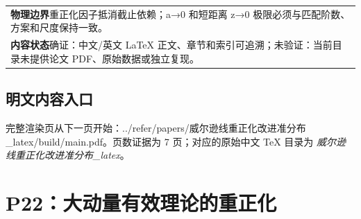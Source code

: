 \documentclass[UTF8,11pt,oneside]{ctexbook}
\begin{document}
\begin{table}[htbp]
\begin{tabular}{@{}p{}@{}}
    \textbf{物理边界}\quad 重正化因子抵消截止依赖；a→0 和短距离 z→0 极限必须与匹配阶数、方案和尺度保持一致。 \\
    \textbf{内容状态}\quad 确证：中文/英文 LaTeX 正文、章节和索引可追溯；未验证：当前目录未提供论文 PDF、原始数据或独立复现。 \\
    \bottomrule
  \end{tabular}
\end{table}
\section*{明文内容入口}
\noindent 完整渲染页从下一页开始：../\allowbreak{}refer/\allowbreak{}papers/\allowbreak{}威尔逊线重正化改进准分布\_\allowbreak{}latex/\allowbreak{}build/\allowbreak{}main.pdf。页数证据为 7 页；对应的原始中文 TeX 目录为 \emph{威尔逊线重正化改进准分布\_latex}。
\clearpage

\clearpage

\chapter{P22：大动量有效理论的重正化}
\end{document}
